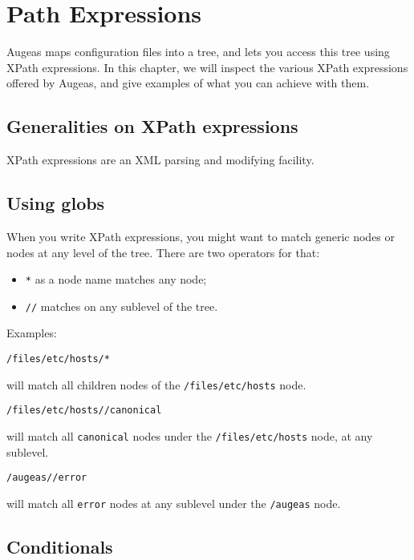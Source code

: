 \chapter{Path Expressions}

 

Augeas maps configuration files into a tree, and lets you access this tree using XPath expressions. In this chapter, we will inspect the various XPath expressions offered by Augeas, and give examples of what you can achieve with them.

\section{Generalities on XPath expressions}

XPath expressions are an XML parsing and modifying facility.

\section{Using globs}

When you write XPath expressions, you might want to match generic nodes or nodes at any level of the tree. There are two operators for that:

\begin{itemize}
\item
  \verb!*! as a node name matches any node;
\item
  \nolinkurl{//} matches on any sublevel of the tree.
\end{itemize}
Examples:

\begin{verbatim}
/files/etc/hosts/*
\end{verbatim}
will match all children nodes of the \nolinkurl{/files/etc/hosts} node.

\begin{verbatim}
/files/etc/hosts//canonical
\end{verbatim}
will match all \verb!canonical! nodes under the \nolinkurl{/files/etc/hosts} node, at any sublevel.


\begin{verbatim}
/augeas//error
\end{verbatim}
will match all \verb!error! nodes at any sublevel under the \nolinkurl{/augeas} node.

\section{Conditionals}


